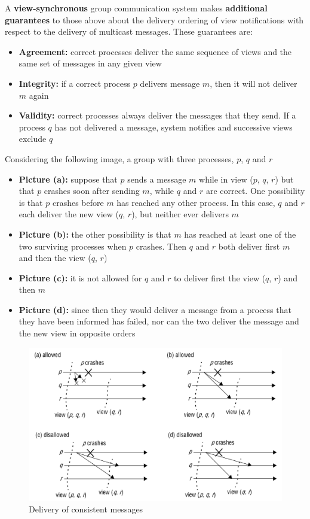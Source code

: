 A \textbf{view-synchronous} group communication system makes \textbf{additional guarantees} to those above about the delivery ordering of view notifications with respect to the delivery of multicast messages. These guarantees are:
\begin{itemize}
    \item \textbf{Agreement:} correct processes deliver the same sequence of views and the same set of messages in any given view
    \item \textbf{Integrity:} if a correct process \(p\) delivers message \(m\), then it will not deliver \(m\) again
    \item \textbf{Validity:} correct processes always deliver the messages that they send. If a process \(q\) has not delivered a message, system notifies and successive views exclude \(q\)
\end{itemize}

Considering the following image, a group with three processes, \(p\), \(q\) and \(r\)
\begin{itemize}
    \item \textbf{Picture (a):} suppose that \(p\) sends a message \(m\) while in view (\(p\), \(q\), \(r\)) but that \(p\) crashes soon after sending \(m\), while \(q\) and \(r\) are correct. One possibility is that \(p\) crashes before \(m\) has reached any other process. In this case, \(q\) and \(r\) each deliver the new view (\(q\), \(r\)), but neither ever delivers \(m\)
    \item \textbf{Picture (b):} the other possibility is that \(m\) has reached at least one of the two surviving processes when \(p\) crashes. Then \(q\) and \(r\) both deliver first \(m\) and then the view (\(q\), \(r\)) 
    \item \textbf{Picture (c):} it is not allowed for \(q\) and \(r\) to deliver first the view (\(q\), \(r\)) and then \(m\)
    \item \textbf{Picture (d):} since then they would deliver a message from a process that they have been informed has failed, nor can the two deliver the message and the new view in opposite orders
\end{itemize}

\begin{figure}[!h]
    \centering
    \includegraphics[width=.70\linewidth]{images/roleGroupCommunication/ConsistentMessage.png}
    \caption{Delivery of consistent messages}
\end{figure}
\newpage

